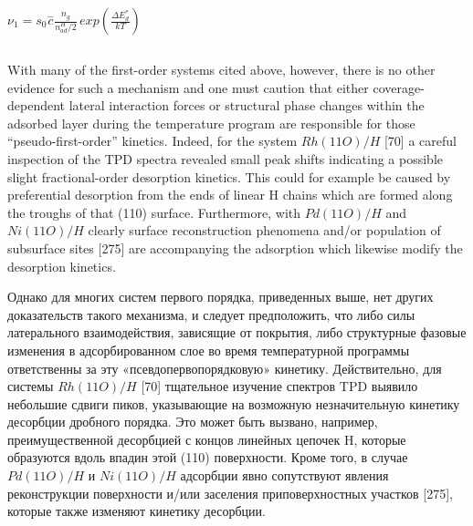 \documentclass[11pt]{article}
\makeatletter
\newcommand{\boxspacing}{\kern\kvtcb@left@rule\kern\kvtcb@boxsep}
\newcommand{\prompt}[4]{
        {\ttfamily\llap{{\color{#2}[#3]:\hspace{3pt}#4}}\vspace{-\baselineskip}}
    }
\makeatother
\begin{document}
    \(\nu_1 = s_0\overset{-}c \frac{n_g}{n_{ad}^{H}/2} \, exp \left(\frac{\Delta E^{*}_{d}}{kT} \right)\)

    \begin{tcolorbox}[breakable, size=fbox, boxrule=1pt, pad at break*=1mm,colback=cellbackground, colframe=cellborder]
\prompt{In}{incolor}{ }{\boxspacing}
\begin{Verbatim}[commandchars=\\\{\}]

\end{Verbatim}
\end{tcolorbox}

    With many of the first-order systems cited above, however, there is no
other evidence for such a mechanism and one must caution that either
coverage-dependent lateral interaction forces or structural phase
changes within the adsorbed layer during the temperature program are
responsible for those ``pseudo-first-order'' kinetics. Indeed, for the
system \(Rh(11O)/H\) {[}70{]} a careful inspection of the TPD spectra
revealed small peak shifts indicating a possible slight fractional-order
desorption kinetics. This could for example be caused by preferential
desorption from the ends of linear H chains which are formed along the
troughs of that (110) surface. Furthermore, with \(Pd(11O)/H\) and
\(Ni(11O)/H\) clearly surface reconstruction phenomena and/or population
of subsurface sites {[}275{]} are accompanying the adsorption which
likewise modify the desorption kinetics.

    Однако для многих систем первого порядка, приведенных выше, нет других
доказательств такого механизма, и следует предположить, что либо силы
латерального взаимодействия, зависящие от покрытия, либо структурные
фазовые изменения в адсорбированном слое во время температурной
программы ответственны за эту «псевдопервопорядковую» кинетику.
Действительно, для системы \(Rh(11O)/H\) {[}70{]} тщательное изучение
спектров TPD выявило небольшие сдвиги пиков, указывающие на возможную
незначительную кинетику десорбции дробного порядка. Это может быть
вызвано, например, преимущественной десорбцией с концов линейных цепочек
H, которые образуются вдоль впадин этой (110) поверхности. Кроме того, в
случае \(Pd(11O)/H\) и \(Ni(11O)/H\) адсорбции явно сопутствуют явления
реконструкции поверхности и/или заселения приповерхностных участков
{[}275{]}, которые также изменяют кинетику десорбции.

    \begin{tcolorbox}[breakable, size=fbox, boxrule=1pt, pad at break*=1mm,colback=cellbackground, colframe=cellborder]
\prompt{In}{incolor}{ }{\boxspacing}
\begin{Verbatim}[commandchars=\\\{\}]

\end{Verbatim}
\end{tcolorbox}
\end{document}
